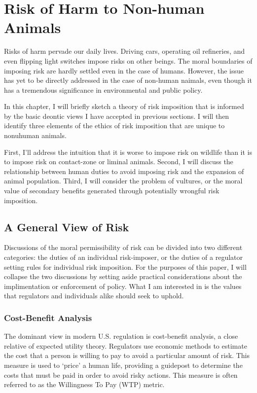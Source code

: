 \chapter{Risk of Harm to Non-human Animals}

Risks of harm pervade our daily lives. Driving cars, operating oil refineries,
and even flipping light switches impose risks on other beings.  The moral
boundaries of imposing risk are hardly settled even in the case of humans.
However, the issue has yet to be directly addressed in the case of non-human
naimals, even though it has a tremendous significance in environmental and
public policy.

In this chapter, I will briefly sketch a theory of risk imposition that is informed by the basic deontic views I have accepted in previous sections.
I will then identify three elements of the ethics of risk imposition that are unique to nonuhuman animals.

First, I’ll address the intuition that it is worse to impose risk on wildlife than it is to impose risk on contact-zone or liminal animals.
Second, I will discuss the relationship between human duties to avoid imposing risk and the expansion of animal population.
Third, I will consider the problem of vultures, or the moral value of secondary benefits generated through potentially wrongful risk imposition.

\section{A General View of Risk}

Discussions of the moral permissibility of risk can be divided into two
different categories: the duties of an individual risk-imposer, or the duties
of a regulator setting rules for individual risk imposition. For the purposes
of this paper, I will collapse the two discussions by setting aside practical
considerations about the implimentation or enforcement of policy. What I am
interested in is the values that regulators and individuals alike should seek
to uphold.

\subsection{Cost-Benefit Analysis}

The dominant view in modern U.S. regulation is cost-benefit analysis, a close
relative of expected utility theory. Regulators use economic methods to
estimate the cost that a person is willing to pay to avoid a particular amount
of risk.  This measure is used to ‘price’ a human life, providing a guidepost
to determine the costs that must be paid in order to avoid risky actions. This
measure is often referred to as the Willingness To Pay (WTP) metric.

